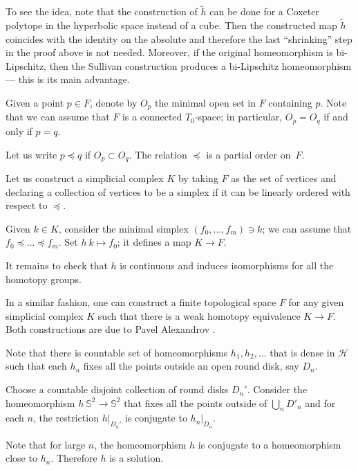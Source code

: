 To see the idea, note that the construction of $\tilde h$ can be done for a Coxeter polytope in the hyperbolic space instead of a cube.
Then the constructed map $\tilde h$
coincides with the identity on the absolute and therefore the last ``shrinking'' step in the proof above is not needed.
Moreover, 
if the original homeomorphism is bi-Lipschitz,
then the Sullivan construction produces a bi-Lipschitz homeomorphism ---
this is its main advantage.

  

Given a point $p\in F$,
denote by $O_p$ the minimal open set in $F$ containing $p$. 
Note that we can assume that $F$ is a connected $T_0$-space;
in particular, $O_p=O_q$ if and only if $p=q$.

Let us write $p\preccurlyeq q$ 
if $O_p\subset O_q$.
The relation $\preccurlyeq$ is a partial order on~$F$.

Let us construct a simplicial complex $K$ 
by taking $F$ as the set of vertices
and declaring a collection of vertices to be a simplex 
if it can be linearly ordered with respect to $\preccurlyeq$.

Given $k\in K$,
consider the minimal simplex $(f_0,\dots,f_m)\ni k$;
we can assume that $f_0\preccurlyeq \dots\preccurlyeq f_m$.
Set $h\:k\mapsto f_0$;
it defines a map $K\to F$.

It remains to check that $h$ is continuous 
and induces isomorphisms for all the homotopy groups.
\qeds

In a similar fashion, one can construct a finite topological space $F$ for any given simplicial complex $K$ 
such that 
there is a weak homotopy equivalence $K\to F$.
Both constructions are due to Pavel Alexandrov
\cite{alexandrov-finite,mccord}.

Note that there is countable set of homeomorphisms $h_1,h_2,\dots$ that is dense in $\mathcal{H}$
such that
each $h_n$ fixes all the points outside an open round disk, say $D_n$.

Choose a countable disjoint collection of round disks $D_n'$.
Consider the homeomorphism $h\:\mathbb S^2\to \mathbb S^2$
that fixes all the points outside of $\bigcup_nD'_n$ and
for each $n$,
the restriction $h|_{D_n'}$ is conjugate to $h_n|_{D_n}$. 


Note that for large $n$, the homeomorphism $h$ is conjugate to a homeomorphism close to $h_n$.
Therefore $h$ is a solution.
\qeds

